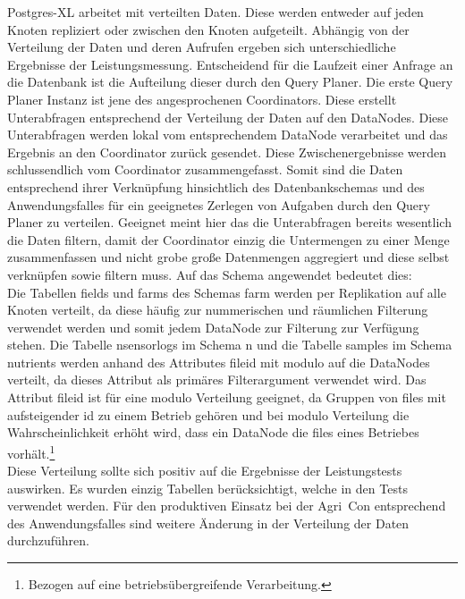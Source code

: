Postgres-XL arbeitet mit verteilten Daten.
Diese werden entweder auf jeden Knoten repliziert oder zwischen den Knoten aufgeteilt.
Abhängig von der Verteilung der Daten und deren Aufrufen ergeben sich unterschiedliche Ergebnisse der Leistungsmessung.
Entscheidend für die Laufzeit einer Anfrage an die Datenbank ist die Aufteilung dieser durch den Query Planer.
Die erste Query Planer Instanz ist jene des angesprochenen Coordinators.
Diese erstellt Unterabfragen entsprechend der Verteilung der Daten auf den DataNodes.
Diese Unterabfragen werden lokal vom entsprechendem DataNode verarbeitet und das Ergebnis an den Coordinator zurück gesendet.
Diese Zwischenergebnisse werden schlussendlich vom Coordinator zusammengefasst.
Somit sind die Daten entsprechend ihrer Verknüpfung hinsichtlich des Datenbankschemas und des Anwendungsfalles für ein geeignetes Zerlegen von Aufgaben durch den Query Planer zu verteilen.
Geeignet meint hier das die Unterabfragen bereits wesentlich die Daten filtern, damit der Coordinator einzig die Untermengen zu einer Menge zusammenfassen und nicht grobe große Datenmengen aggregiert und diese selbst verknüpfen sowie filtern muss.
Auf das Schema angewendet bedeutet dies:\\
Die Tabellen fields und farms des Schemas farm werden per Replikation auf alle Knoten verteilt, da diese häufig zur nummerischen und räumlichen Filterung verwendet werden und somit jedem DataNode zur Filterung zur Verfügung stehen.
Die Tabelle nsensorlogs im Schema n und die Tabelle samples im Schema nutrients werden anhand des Attributes fileid mit modulo auf die DataNodes verteilt, da dieses Attribut als primäres Filterargument verwendet wird.
Das Attribut fileid ist für eine modulo Verteilung geeignet, da Gruppen von files mit aufsteigender id zu einem Betrieb gehören und bei modulo Verteilung die Wahrscheinlichkeit erhöht wird, dass ein DataNode die files eines Betriebes vorhält.\footnote{Bezogen auf eine betriebsübergreifende Verarbeitung.}\\
Diese Verteilung sollte sich positiv auf die Ergebnisse der Leistungstests auswirken.
Es wurden einzig Tabellen berücksichtigt, welche in den Tests verwendet werden.
Für den produktiven Einsatz bei der Agri~Con entsprechend des Anwendungsfalles sind weitere Änderung in der Verteilung der Daten durchzuführen.


